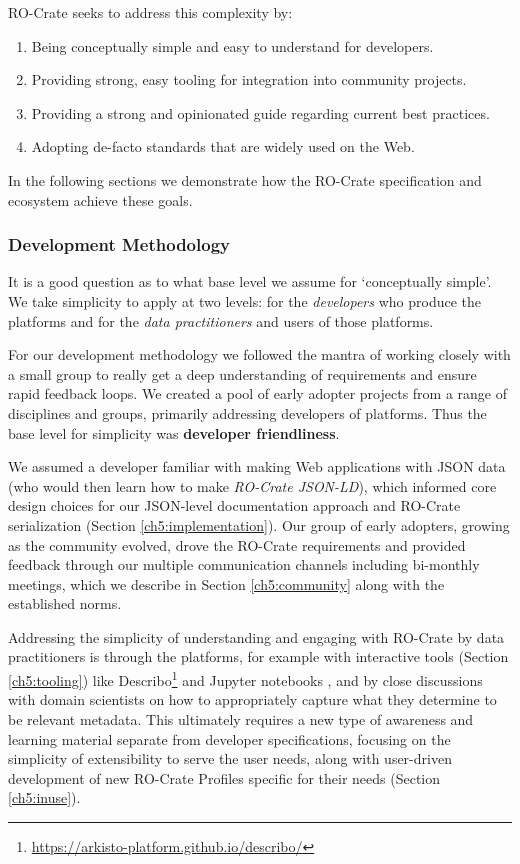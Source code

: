RO-Crate seeks to address this complexity by:

\begin{enumerate}
  \item Being conceptually simple and easy to understand for developers.
  \item Providing strong, easy tooling for integration into community projects.
  \item Providing a strong and opinionated guide regarding current best practices.
  \item Adopting de-facto standards that are widely used on the Web.
\end{enumerate}

In the following sections we demonstrate how the RO-Crate specification
and ecosystem achieve these goals.

\subsubsection{Development Methodology}\label{ch5:methodology}

It is a good question as to what base level we assume for `conceptually
simple'. We take simplicity to apply at two levels: for the
\emph{developers} who produce the platforms and for the \emph{data
practitioners} and users of those platforms.

For our development methodology we followed the mantra of working
closely with a small group to really get a deep understanding of
requirements and ensure rapid feedback loops. We created a pool of early
adopter projects from a range of disciplines and groups, primarily
addressing developers of platforms. Thus the base level for simplicity
was \textbf{developer friendliness}.

We assumed a developer familiar with making Web applications with \acrshort{JSON}
data (who would then learn how to make \emph{RO-Crate JSON-LD}), which
informed core design choices for our JSON-level documentation approach
and RO-Crate serialization (Section \vref{ch5:implementation}). Our group of early
adopters, growing as the community evolved, drove the RO-Crate
requirements and provided feedback through our multiple communication
channels including bi-monthly meetings, which we describe in Section \vref{ch5:community} along with the established norms.

Addressing the simplicity of understanding and engaging with RO-Crate by
data practitioners is through the platforms, for example with
interactive tools (Section \vref{ch5:tooling}) like
Describo\footnote{\url{https://arkisto-platform.github.io/describo/}} \cite{La Rosa 2021d} and
Jupyter notebooks
\cite{Kluyver 2016}, and by
close discussions with domain scientists on how to appropriately capture
what they determine to be relevant metadata. This ultimately requires a
new type of awareness and learning material separate from developer
specifications, focusing on the simplicity of extensibility to serve the
user needs, along with user-driven development of new RO-Crate Profiles
specific for their needs (Section \vref{ch5:inuse}).

